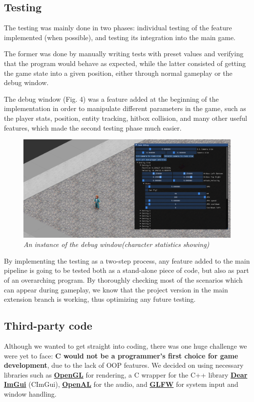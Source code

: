 \documentclass{article}
\begin{document}
\subsection{Testing}
The testing was mainly done in two phases: individual testing of the feature implemented (when possible), and testing its integration into the main game.\par
The former was done by manually writing tests with preset values and verifying that the program would behave as expected, while the latter consisted of getting the game state into a given position, either through normal gameplay or the debug window. \par
The debug window (Fig. 4) was a feature added at the beginning of the implementation in order to manipulate different parameters in the game, such as the player stats, position, entity tracking, hitbox collision, and many other useful features, which made the second testing phase much easier. 
\begin{figure}[H]
\includegraphics[scale=0.3]{images/debugwindow.png}
\centering
\caption{\textit{An instance of the debug window(character statistics showing)}}
\end{figure}
By implementing the testing as a two-step process, any feature added to the main pipeline is going to be tested both as a stand-alone piece of code, but also as part of an overarching program. By thoroughly checking most of the scenarios which can appear during gameplay, we know that the project version in the main extension branch is working, thus optimizing any future testing.
\subsection{Third-party code}
Although we wanted to get straight into coding, there was one huge challenge we were yet to face: \textbf{C would not be a programmer's first choice for game development}, due to the lack of OOP features. We decided on using necessary libraries such as \href{https://www.opengl.org}{\textbf{OpenGL}} for rendering, a C wrapper for the C++ library \href{https://www.dearimgui.com}{\textbf{Dear ImGui}}  (CImGui), \href{https://www.openal.org}{\textbf{OpenAL}} for the audio, and \href{https://www.glfw.org}{\textbf{GLFW}} for system input and window handling.
\end{document}
